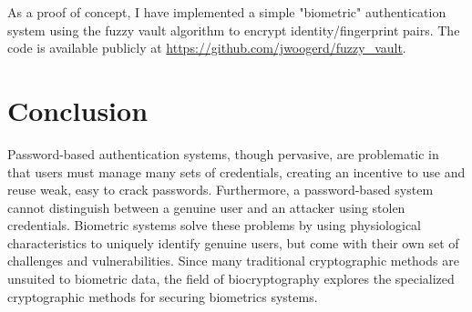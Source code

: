 \documentclass[11pt]{article}
\begin{document}
As a proof of concept, I have implemented a 
simple "biometric" authentication system using the fuzzy vault
algorithm to encrypt identity/fingerprint pairs. The
code is available publicly at \url{https://github.com/jwoogerd/fuzzy_vault}.

\section{Conclusion}
Password-based authentication systems, though pervasive, are problematic in
that users must manage many sets of credentials, creating an incentive to use
and reuse weak, easy to crack passwords. Furthermore, a password-based system
cannot distinguish between a genuine user and an attacker using stolen credentials. Biometric systems solve these problems by using physiological characteristics 
to uniquely identify genuine users, but come with their own set of challenges
and vulnerabilities. Since many traditional cryptographic methods are unsuited to biometric data, the field of biocryptography explores the specialized 
cryptographic methods for securing biometrics systems.
\singlespace
\nocite{*}

{}

\end{document}
